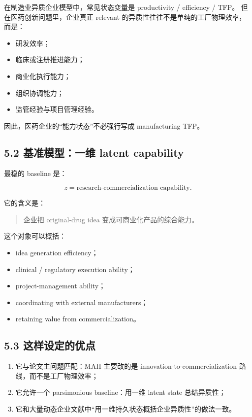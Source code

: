 \documentclass[12pt,fontset=none]{ctexart}
\begin{document}
在制造业异质企业模型中，常见状态变量是 productivity / efficiency / TFP。
但在医药创新问题里，企业真正 relevant 的异质性往往不是单纯的工厂物理效率，而是：

\begin{itemize}[leftmargin=2em]
    \item 研发效率；
    \item 临床或注册推进能力；
    \item 商业化执行能力；
    \item 组织协调能力；
    \item 监管经验与项目管理经验。
\end{itemize}

因此，医药企业的“能力状态”不必强行写成 manufacturing TFP。

\subsection{5.2 基准模型：一维 latent capability}

最稳的 baseline 是：

\[
z=\text{research-commercialization capability}.
\]

它的含义是：

\begin{quote}
企业把 original-drug idea 变成可商业化产品的综合能力。
\end{quote}

这个对象可以概括：

\begin{itemize}[leftmargin=2em]
    \item idea generation efficiency；
    \item clinical / regulatory execution ability；
    \item project-management ability；
    \item coordinating with external manufacturers；
    \item retaining value from commercialization。
\end{itemize}

\subsection{5.3 这样设定的优点}

\begin{enumerate}[leftmargin=2em]
    \item 它与论文主问题匹配：MAH 主要改的是 innovation-to-commercialization 路线，而不是工厂物理效率；
    \item 它允许一个 parsimonious baseline：用一维 latent state 总结异质性；
    \item 它和大量动态企业文献中“用一维持久状态概括企业异质性”的做法一致。
\end{enumerate}
\end{document}
